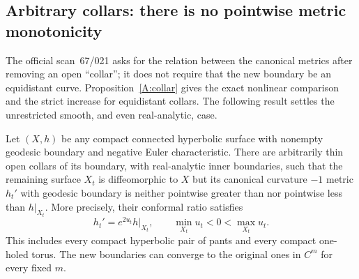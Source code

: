 \subsection{Arbitrary collars: there is no pointwise metric monotonicity}
\label{C:A2e-section}

The official scan~67/021 asks for the relation between the canonical metrics after removing an open ``collar''; it does not require that the new boundary be an equidistant curve. Proposition~\ref{A:collar} gives the exact nonlinear comparison and the strict increase for equidistant collars. The following result settles the unrestricted smooth, and even real-analytic, case.

\begin{theorem}
\label{C:A2e-nonmonotonicity}
Let $(X,h)$ be any compact connected hyperbolic surface with nonempty geodesic boundary and negative Euler characteristic. There are arbitrarily thin open collars of its boundary, with real-analytic inner boundaries, such that the remaining surface $X_t$ is diffeomorphic to $X$ but its canonical curvature $-1$ metric $h_t'$ with geodesic boundary is neither pointwise greater than nor pointwise less than $h|_{X_t}$. More precisely, their conformal ratio satisfies
\[
 h_t'=e^{2u_t}h|_{X_t},
 \qquad \min_{X_t}u_t<0<\max_{X_t}u_t.
\]
This includes every compact hyperbolic pair of pants and every compact one-holed torus. The new boundaries can converge to the original ones in $C^m$ for every fixed $m$.
\end{theorem}

